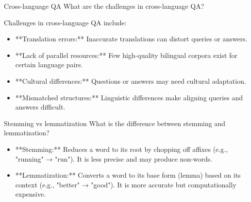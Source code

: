 \documentclass{article}
\begin{document}
\begin{exercise}{Cross-language QA}
  What are the challenges in cross-language QA?

  \begin{solution}
    Challenges in cross-language QA include:
    \begin{itemize}
        \item **Translation errors:** Inaccurate translations can distort queries or answers.
        \item **Lack of parallel resources:** Few high-quality bilingual corpora exist for certain language pairs.
        \item **Cultural differences:** Questions or answers may need cultural adaptation.
        \item **Mismatched structures:** Linguistic differences make aligning queries and answers difficult.
    \end{itemize}
  \end{solution}
\end{exercise}

\begin{exercise}{Stemming vs lemmatization}
  What is the difference between stemming and lemmatization?

  \begin{solution}
    \begin{itemize}
        \item **Stemming:** Reduces a word to its root by chopping off affixes (e.g., "running" → "run"). It is less precise and may produce non-words.
        \item **Lemmatization:** Converts a word to its base form (lemma) based on its context (e.g., "better" → "good"). It is more accurate but computationally expensive.
    \end{itemize}
  \end{solution}
\end{exercise}
\end{document}
